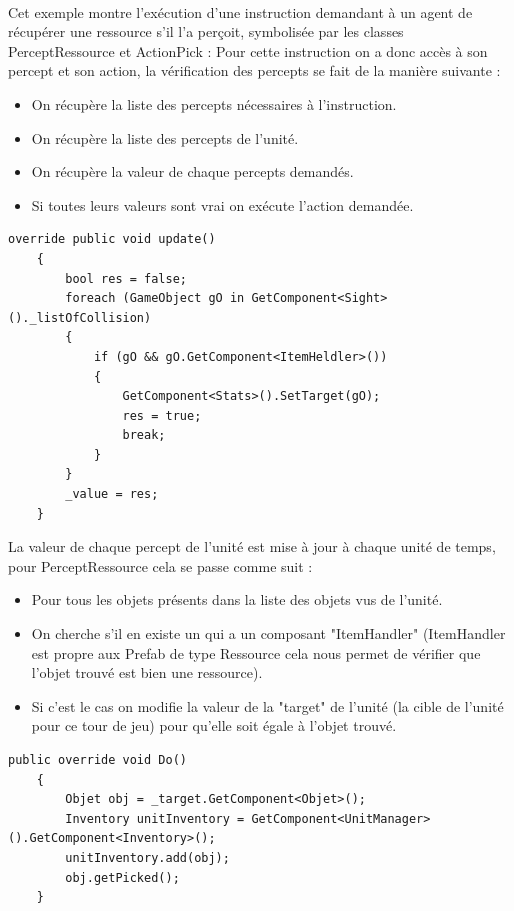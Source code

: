 \documentclass{report}
\begin{document}
\paragraph{}Cet exemple montre l'exécution d'une instruction demandant à un agent de récupérer une ressource s'il l'a perçoit, symbolisée par les classes PerceptRessource et ActionPick :
Pour cette instruction on a donc accès à son percept et son action, la vérification des percepts se fait de la manière suivante :
\begin{itemize}
\item On récupère la liste des percepts nécessaires à l'instruction.
\item On récupère la liste des percepts de l'unité.
\item On récupère la valeur de chaque percepts demandés.
\item Si toutes leurs valeurs sont vrai on exécute l'action demandée.
\end{itemize}
\begin{lstlisting}[language={[Sharp]C},label={lst:unitScript}, caption=  Extrait du code du script PerceptRessource.cs première version.]
    override public void update()
    {
        bool res = false;
        foreach (GameObject gO in GetComponent<Sight>()._listOfCollision)
        {
            if (gO && gO.GetComponent<ItemHeldler>())
            {
                GetComponent<Stats>().SetTarget(gO);
                res = true;
                break;
            }
        }
        _value = res;
    }
\end{lstlisting}
La valeur de chaque percept de l'unité est mise à jour à chaque unité de temps, pour PerceptRessource cela se passe comme suit :
\begin{itemize}
\item Pour tous les objets présents dans la liste des objets vus de l'unité.
\item On cherche s'il en existe un qui a un composant "ItemHandler" (ItemHandler est propre aux Prefab de type Ressource cela nous permet de vérifier que l'objet trouvé est bien une ressource).
\item Si c'est le cas on modifie la valeur de la "target" de l'unité (la cible de l'unité pour ce tour de jeu) pour qu'elle soit égale à l'objet trouvé.
\end{itemize}
\begin{lstlisting}[language={[Sharp]C},label={lst:unitScript}, caption=  Extrait du code du script ActionPick.cs première version.]
    public override void Do()
    {
        Objet obj = _target.GetComponent<Objet>();
        Inventory unitInventory = GetComponent<UnitManager>().GetComponent<Inventory>();
        unitInventory.add(obj);
        obj.getPicked();
    }
\end{lstlisting}
\end{document}
